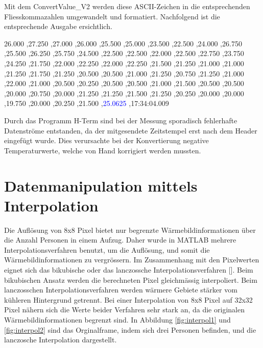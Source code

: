 Mit dem ConvertValue\_V2 werden diese \ac{ASCII}-Zeichen in die entsprechenden Fliesskommazahlen umgewandelt und formatiert. Nachfolgend ist die entsprechende Ausgabe ersichtlich.

26.000 ,27.250 ,27.000 ,26.000 ,25.500 ,25.000 ,23.500 ,22.500 ,24.000 ,26.750 ,25.500 ,26.250 ,25.750 ,24.500 ,22.500 ,22.500 ,22.000 ,22.500 ,22.750 ,23.750 ,24.250 ,21.750 ,22.000 ,22.250 ,22.000 ,22.250 ,21.500 ,21.250 ,21.000 ,21.000 ,21.250 ,21.750 ,21.250 ,20.500 ,20.500 ,21.000 ,21.250 ,20.750 ,21.250 ,21.000 ,22.000 ,21.000 ,20.500 ,20.250 ,20.500 ,20.500 ,21.000 ,21.500 ,20.500 ,20.500 ,20.000 ,20.750 ,20.000 ,21.250 ,21.250 ,21.500 ,21.250 ,20.250 ,20.000 ,20.000 ,19.750 ,20.000 ,20.250 ,21.500 ,\textcolor{blue}{25.0625} ,17:34:04.009

Durch das Programm H-Term sind bei der Messung sporadisch fehlerhafte Datenströme entstanden, da der mitgesendete Zeitstempel erst nach dem Header eingefügt wurde. Dies verursachte bei der Konvertierung negative Temperaturwerte, welche von Hand korrigiert werden mussten. 


\section{Datenmanipulation mittels Interpolation}
\label{sec:Datenmanipulation}

Die Auflösung von 8x8 Pixel bietet nur begrenzte Wärmebildinformationen über die Anzahl Personen in einem Aufzug. Daher wurde in MATLAB mehrere Interpolationsverfahren benutzt, um die Auflösung, und somit die Wärmebildinformationen zu vergrössern. Im Zusammenhang mit den Pixelwerten eignet sich das bikubische oder das lanczossche Interpolationsverfahren [\protect\cite{Interpol}]. Beim bikubischen Ansatz werden die berechneten Pixel gleichmässig interpoliert. Beim lanczosschen Interpolationsverfahren werden wärmere Gebiete stärker vom kühleren Hintergrund getrennt. Bei einer Interpolation von 8x8 Pixel auf 32x32 Pixel nähern sich die Werte beider Verfahren sehr stark an, da die originalen Wärmebildinformationen begrenzt sind. In Abbildung \ref{fig:interpol1} und \ref{fig:interpol2} sind das Orginalframe, indem sich drei Personen befinden, und die lanczosche Interpolation dargestellt.


